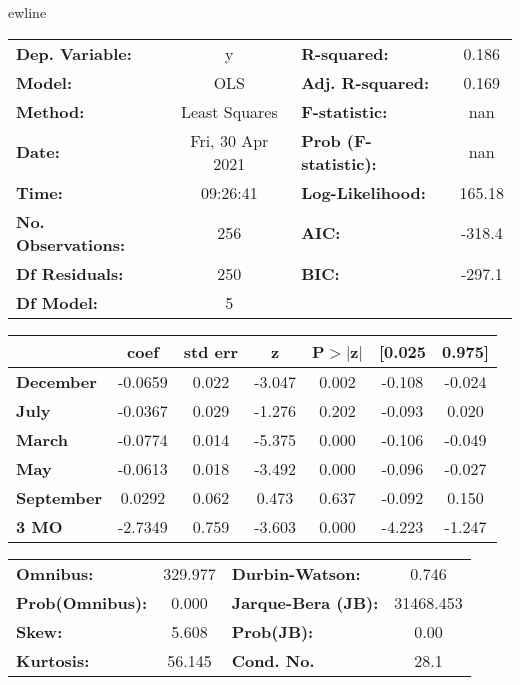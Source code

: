 ewline\begin{center}
\begin{tabular}{lclc}
\toprule
\textbf{Dep. Variable:}    &        y         & \textbf{  R-squared:         } &     0.186   \\
\textbf{Model:}            &       OLS        & \textbf{  Adj. R-squared:    } &     0.169   \\
\textbf{Method:}           &  Least Squares   & \textbf{  F-statistic:       } &       nan   \\
\textbf{Date:}             & Fri, 30 Apr 2021 & \textbf{  Prob (F-statistic):} &      nan    \\
\textbf{Time:}             &     09:26:41     & \textbf{  Log-Likelihood:    } &    165.18   \\
\textbf{No. Observations:} &         256      & \textbf{  AIC:               } &    -318.4   \\
\textbf{Df Residuals:}     &         250      & \textbf{  BIC:               } &    -297.1   \\
\textbf{Df Model:}         &           5      & \textbf{                     } &             \\
\bottomrule
\end{tabular}
\begin{tabular}{lcccccc}
                   & \textbf{coef} & \textbf{std err} & \textbf{z} & \textbf{P$> |$z$|$} & \textbf{[0.025} & \textbf{0.975]}  \\
\midrule
\textbf{December}  &      -0.0659  &        0.022     &    -3.047  &         0.002        &       -0.108    &       -0.024     \\
\textbf{July}      &      -0.0367  &        0.029     &    -1.276  &         0.202        &       -0.093    &        0.020     \\
\textbf{March}     &      -0.0774  &        0.014     &    -5.375  &         0.000        &       -0.106    &       -0.049     \\
\textbf{May}       &      -0.0613  &        0.018     &    -3.492  &         0.000        &       -0.096    &       -0.027     \\
\textbf{September} &       0.0292  &        0.062     &     0.473  &         0.637        &       -0.092    &        0.150     \\
\textbf{3 MO}      &      -2.7349  &        0.759     &    -3.603  &         0.000        &       -4.223    &       -1.247     \\
\bottomrule
\end{tabular}
\begin{tabular}{lclc}
\textbf{Omnibus:}       & 329.977 & \textbf{  Durbin-Watson:     } &     0.746  \\
\textbf{Prob(Omnibus):} &   0.000 & \textbf{  Jarque-Bera (JB):  } & 31468.453  \\
\textbf{Skew:}          &   5.608 & \textbf{  Prob(JB):          } &      0.00  \\
\textbf{Kurtosis:}      &  56.145 & \textbf{  Cond. No.          } &      28.1  \\
\bottomrule
\end{tabular}
\end{center}

